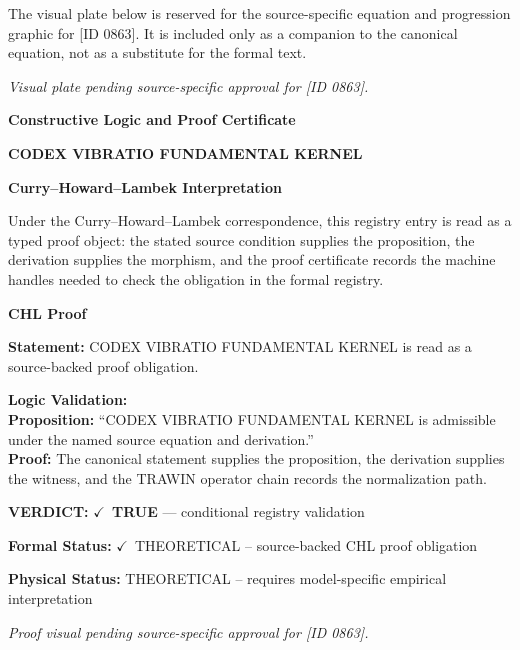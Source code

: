 \begingroup\footnotesize\sloppy
The visual plate below is reserved for the source-specific equation and progression graphic for [ID 0863]. It is included only as a companion to the canonical equation, not as a substitute for the formal text.
\par\endgroup
\begingroup\footnotesize\itshape
Visual plate pending source-specific approval for [ID 0863].
\par\endgroup

\clearpage
\begingroup\tzpsupportsetup
\noindent\textbf{\fontsize{10.8pt}{12.8pt}\selectfont [ID 0863] Constructive Logic and Proof Certificate}\par
\noindent\textbf{\fontsize{10pt}{12pt}\selectfont CODEX VIBRATIO FUNDAMENTAL KERNEL}\par
\vspace{0.45em}
\begingroup
\footnotesize
\setlength{\parskip}{0.22em}
\setlength{\parindent}{0pt}
\noindent\textbf{Curry--Howard--Lambek Interpretation}\par
Under the Curry--Howard--Lambek correspondence, this registry entry is read as a typed proof
object: the stated source condition supplies the proposition, the derivation supplies the
morphism, and the proof certificate records the machine handles needed to check the obligation
in the formal registry.

\vspace{0.45em}
\noindent\textbf{CHL Proof}\par
\textbf{Statement:} CODEX VIBRATIO FUNDAMENTAL KERNEL is read as a source-backed proof obligation.

\textbf{Logic Validation:}\\
\textbf{Proposition:} ``CODEX VIBRATIO FUNDAMENTAL KERNEL is admissible under the named source equation and derivation.''\\
\textbf{Proof:} The canonical statement supplies the proposition, the derivation supplies the witness, and the TRAWIN operator chain records the normalization path.

\textbf{VERDICT:} \ensuremath{\checkmark}\ \textbf{TRUE} --- conditional registry validation

\textbf{Formal Status:} \ensuremath{\checkmark}\ THEORETICAL -- source-backed CHL proof obligation

\textbf{Physical Status:} THEORETICAL -- requires model-specific empirical interpretation
\par\vspace{0.45em}
\par
\vfill
\begingroup\footnotesize\itshape
Proof visual pending source-specific approval for [ID 0863].
\par\endgroup
\vfill
\endgroup
\endgroup
